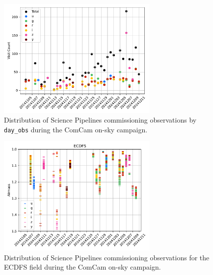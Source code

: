 \begin{figure}
    \begin{center}
        \includegraphics[width=0.7\textwidth]{observations_figures/comcam_science_visit_count_day_obs.pdf}
    \end{center}
    \caption{Distribution of Science Pipelines commissioning observations by \texttt{day\_obs} during the ComCam on-sky campaign.}
    \label{fig:comcam_science_day_obs}
\end{figure}

\begin{figure}
    \begin{center}
        \includegraphics[width=0.7\textwidth]{observations_figures/comcam_science_airmass_day_obs_ecdfs.pdf}
    \end{center}
    \caption{Distribution of Science Pipelines commissioning observations for the ECDFS field during the ComCam on-sky campaign.}
    \label{fig:comcam_science_day_obs_ecdfs}
\end{figure}
